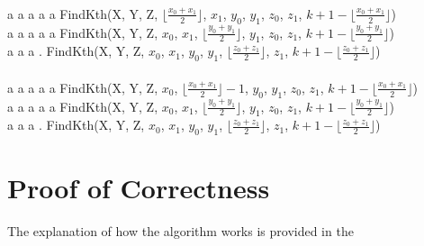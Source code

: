 \documentclass{article}
\begin{document}
\begin{algorithm}[H]
\begin{algorithmic}[1]
    \\
    \\

        \\ \phantom a \phantom a \phantom a \phantom a \phantom a 
        \Return FindKth(X, Y, Z, $\lfloor \frac{x_0 + x_1}{2} \rfloor$, $x_1$, $y_0$, $y_1$, $z_0$, $z_1$, $k + 1 - \lfloor \frac{x_0 + x_1}{2} \rfloor  $)
        \EndIf
        \\ \phantom a \phantom a \phantom a \phantom a \phantom a 
        \Return FindKth(X, Y, Z, $x_0$, $x_1$, $\lfloor \frac{y_0 + y_1}{2} \rfloor$, $y_1$, $z_0$, $z_1$, $k + 1 - \lfloor \frac{y_0 + y_1}{2} \rfloor  $)
        \EndIf
        \\ \phantom a \phantom a \phantom a \phantom . 
        \Return FindKth(X, Y, Z, $x_0$, $x_1$, $y_0$, $y_1$, $\lfloor \frac{z_0 + z_1}{2} \rfloor$, $z_1$, $k + 1 - \lfloor \frac{z_0 + z_1}{2} \rfloor  $)
    \Else
    \\

        \\ \phantom a \phantom a \phantom a \phantom a \phantom a 
        \Return FindKth(X, Y, Z, $x_0$, $\lfloor \frac{x_0 + x_1}{2} \rfloor - 1$, $y_0$, $y_1$, $z_0$, $z_1$, $k + 1 - \lfloor \frac{x_0 + x_1}{2} \rfloor  $)
        \EndIf
        \\ \phantom a \phantom a \phantom a \phantom a \phantom a 
        \Return FindKth(X, Y, Z, $x_0$, $x_1$, $\lfloor \frac{y_0 + y_1}{2} \rfloor$, $y_1$, $z_0$, $z_1$, $k + 1 - \lfloor \frac{y_0 + y_1}{2} \rfloor  $)
        \EndIf
        \\ \phantom a \phantom a \phantom a \phantom . 
        \Return FindKth(X, Y, Z, $x_0$, $x_1$, $y_0$, $y_1$, $\lfloor \frac{z_0 + z_1}{2} \rfloor$, $z_1$, $k + 1 - \lfloor \frac{z_0 + z_1}{2} \rfloor  $)
    \EndIf

\EndFunction

\end{algorithmic}
\end{algorithm}

\section{Proof of Correctness}

The explanation of how the algorithm works is provided in the 
\end{document}
